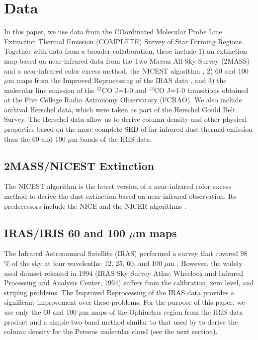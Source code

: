 \documentclass[11pt,a4paper]{emulateapj}
\begin{document}
\section{Data}
\label{sec:data}
In this paper, we use data from the COordinated Molecular Probe Line Extinction Thermal Emission (COMPLETE) Survey of Star Forming Regions. Together with data from a broader collaboration, these include 1) an extinction map based on near-infrared data from the Two Micron All-Sky Survey (2MASS) and a near-infrared color excess method, the NICEST algorithm \citep[][note that this is an improved version of the NICER algorithm and is developed after the COMPLETE Survey]{Lombardi_2009}, 2) 60 and 100 $\mu$m maps from the Improved Reprocessing of the IRAS data \citep[IRIS;]{Miville_Deschenes_2005}, and 3) the molecular line emission of the $^{12}$CO J=1-0 and $^{13}$CO J=1-0 transitions obtained at the Five College Radio Astronomy Observatory (FCRAO). We also include archival Herschel data, which were taken as part of the Herschel Gould Belt Survey. The Herschel data allow us to derive column density and other physical properties based on the more complete SED of far-infrared dust thermal emission than the 60 and 100 $\mu$m bands of the IRIS data.

\subsection{2MASS/NICEST Extinction}
The NICEST algorithm is the latest version of a near-infrared color excess method to derive the dust extinction based on near-infrared observation. Its predecessors include the NICE and the NICER algorithms \citep{Lombardi_2001,Lombardi_2005}.

\subsection{IRAS/IRIS 60 and 100 $\mu$m maps}
The Infrared Astronomical Satellite (IRAS) performed a survey that covered 98 \% of the sky at four wavelenths: 12, 25, 60, and 100 $\mu$m \citep{Neugebauer_1984}. However, the widely used dataset released in 1994 (IRAS Sky Survey Atlas; Wheelock and Infrared Processing and Analysis Center, 1994) suffers from the calibration, zero level, and striping problems. The Improved Reprocessing of the IRAS data \citep[IRIS;]{Miville_Deschenes_2005} provides a significant improvement over these problems. For the purpose of this paper, we use only the 60 and 100 $\mu$m maps of the Ophiuchus region from the IRIS data product and a simple two-band method similar to that used by \citet{Schnee_2008} to derive the column density for the Perseus molecular cloud (see the next section).
\end{document}
